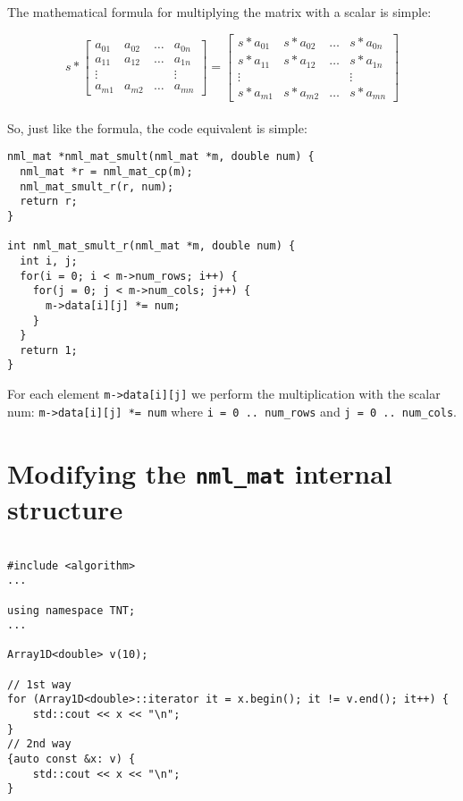 The mathematical formula for multiplying the matrix with a scalar is simple:

$$
s * \left[
\begin{array}{cccc}
a_{01} & a_{02} & \ldots & a_{0n} \\
a_{11} & a_{12} & \ldots & a_{1n} \\
\vdots & & & \vdots \\
a_{m1} & a_{m2} & \ldots & a_{mn} 
\end{array}
\right]
=
\left[
\begin{array}{cccc}
s * a_{01} & s * a_{02} & \ldots & s * a_{0n} \\
s * a_{11} & s * a_{12} & \ldots & s * a_{1n} \\
\vdots & & & \vdots \\
s * a_{m1} & s * a_{m2} & \ldots & s * a_{mn} 
\end{array}
\right]
$$
\\
So, just like the formula, the code equivalent is simple:

\begin{verbatim}
nml_mat *nml_mat_smult(nml_mat *m, double num) {
  nml_mat *r = nml_mat_cp(m);
  nml_mat_smult_r(r, num);
  return r;
}

int nml_mat_smult_r(nml_mat *m, double num) {
  int i, j;
  for(i = 0; i < m->num_rows; i++) {
    for(j = 0; j < m->num_cols; j++) {
      m->data[i][j] *= num;
    }
  }
  return 1;
} 
\end{verbatim}

For each element {\tt m->data[i][j]} we perform the multiplication with the scalar num: {\tt m->data[i][j] *= num} where {\tt i = 0 .. num\_rows} and {\tt j = 0 .. num\_cols}.

\section{Modifying the {\tt nml\_mat} internal structure}



\begin{verbatim}

#include <algorithm>
...

using namespace TNT;
...

Array1D<double> v(10);

// 1st way
for (Array1D<double>::iterator it = x.begin(); it != v.end(); it++) {
    std::cout << x << "\n";
}
// 2nd way
{auto const &x: v) {
    std::cout << x << "\n";
}
\end{verbatim}

